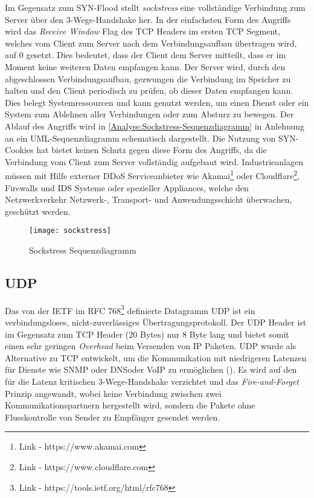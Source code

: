 Im Gegensatz zum SYN-Flood stellt \textit{sockstress} eine vollständige Verbindung zum Server über den 3-Wege-Handshake her. In der einfachsten Form des Angriffs wird das \textit{Receive Window} Flag des \ac{TCP} Headers im ersten \ac{TCP} Segment, welches vom Client zum Server nach dem Verbindungsaufbau übertragen wird, auf 0 gesetzt. Dies bedeutet, dass der Client dem Server mitteilt, dass er im Moment keine weiteren Daten empfangen kann. Der Server wird, durch den abgeschlossen Verbindungsaufbau, gezwungen die Verbindung im Speicher zu halten und den Client periodisch zu prüfen, ob dieser Daten empfangen kann. Dies belegt Systemressourcen und kann genutzt werden, um einen Dienst oder ein System zum Ablehnen aller Verbindungen oder zum Absturz zu bewegen. Der Ablauf des Angriffs wird in \autoref{Analyse:Sockstress-Sequenzdiagramm} in Anlehnung an ein \ac{UML}-Sequenzdiagramm schematisch dargestellt. Die Nutzung von SYN-Cookies hat bietet keinen Schutz gegen diese Form des Angriffs, da die Verbindung vom Client zum Server vollständig aufgebaut wird. Industrieanlagen müssen mit Hilfe externer \ac{DDoS} Serviceanbieter wie Akamai\footnote{Link - https://www.akamai.com} oder Cloudflare\footnote{Link - https://www.cloudflare.com}, Firewalls und \ac{IDS} Systeme oder spezieller Appliances, welche den Netzwerkverkehr Netzwerk-, Transport- und Anwendungsschicht überwachen, geschützt werden.

\begin{figure}[h]
  \centering
  \texttt{[image: sockstress]}
  \caption{Sockstress Sequenzdiagramm}
  \label{Analyse:Sockstress-Sequenzdiagramm}
\end{figure}

\subsection{\ac{UDP}}
Das von der \ac{IETF} im \ac{RFC} 768\footnote{Link - https://tools.ietf.org/html/rfc768} definierte Datagramm \ac{UDP} ist ein verbindungsloses, nicht-zuverlässiges Übertragungsprotokoll. Der \ac{UDP} Header ist im Gegensatz zum \ac{TCP} Header (20 Bytes) nur 8 Byte lang und bietet somit einen sehr geringen \textit{Overhead} beim Versenden von \ac{IP} Paketen. \ac{UDP} wurde als Alternative zu \ac{TCP} entwickelt, um die Kommunikation mit niedrigeren Latenzen für Dienste wie \ac{SNMP} oder \ac{DNS}oder \ac{VoIP} zu ermöglichen (\cite{UDP2003}). Es wird auf den für die Latenz kritischen 3-Wege-Handshake verzichtet und das \textit{Fire-and-Forget} Prinzip angewandt, wobei keine Verbindung zwischen zwei Kommunikationspartnern hergestellt wird, sondern die Pakete ohne Flusskontrolle von Sender zu Empfänger gesendet werden.

